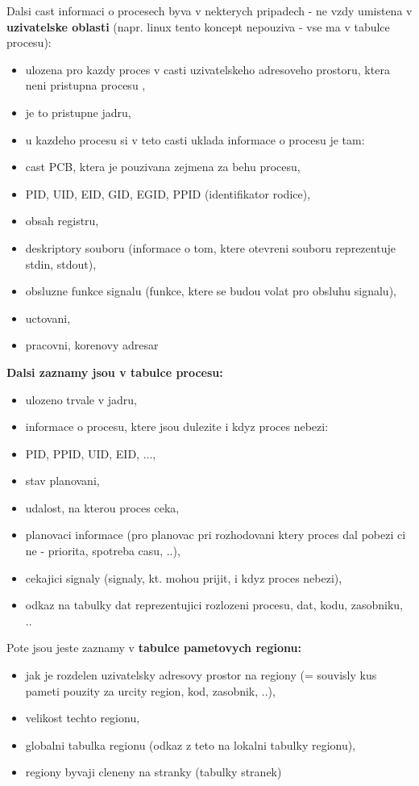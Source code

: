 \documentclass[a4paper, 11pt]{article}
\begin{document}
Dalsi cast informaci o procesech byva v nekterych pripadech - ne vzdy umistena v \textbf{uzivatelske oblasti} (napr. linux tento koncept nepouziva - vse ma v tabulce procesu):
\begin{itemize}
    \item ulozena pro kazdy proces v casti uzivatelskeho adresoveho prostoru, ktera neni pristupna procesu ,
    \item je to pristupne jadru,
    \item u kazdeho procesu si v teto casti uklada informace o procesu je tam:
    \item cast PCB, ktera je pouzivana zejmena za behu procesu,
    \item PID, UID, EID, GID, EGID, PPID (identifikator rodice),
    \item obsah registru,
    \item deskriptory souboru (informace o tom, ktere otevreni souboru reprezentuje stdin, stdout),
    \item obsluzne funkce signalu (funkce, ktere se budou volat pro obsluhu signalu),
    \item uctovani,
    \item pracovni, korenovy adresar \\
\end{itemize}

\textbf{Dalsi zaznamy jsou v tabulce procesu:}
\begin{itemize}
    \item ulozeno trvale v jadru,
    \item informace o procesu, ktere jsou dulezite i kdyz proces nebezi:
    \item PID, PPID, UID, EID, ...,
    \item stav planovani,
    \item udalost, na kterou proces ceka,
    \item planovaci informace (pro planovac pri rozhodovani ktery proces dal pobezi ci ne - priorita, spotreba casu, ..),
    \item cekajici signaly (signaly, kt. mohou prijit, i kdyz proces nebezi),
    \item odkaz na tabulky dat reprezentujici rozlozeni procesu, dat, kodu, zasobniku, .. \\
\end{itemize}

\newpage

Pote jsou jeste zaznamy v \textbf{tabulce pametovych regionu:}
\begin{itemize}
    \item jak je rozdelen uzivatelsky adresovy prostor na regiony (= souvisly kus pameti pouzity za urcity region, kod, zasobnik, ..),
    \item velikost techto regionu,
    \item globalni tabulka regionu (odkaz z teto na lokalni tabulky regionu),
    \item regiony byvaji cleneny na stranky (tabulky stranek) \\
\end{itemize}
\end{document}
